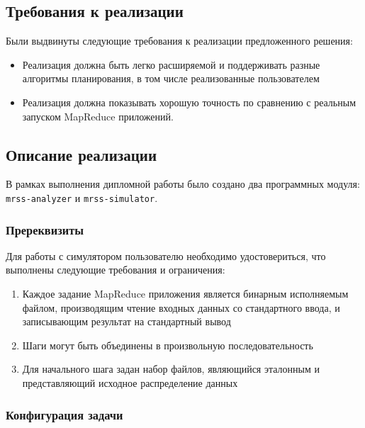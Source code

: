 \documentclass[../diploma.tex]{subfile}
\begin{document}
 
    \subsection{Требования к реализации}
    \label{sec:results:subsec:requirements}

    Были выдвинуты следующие требования к реализации предложенного решения:

    \begin{itemize}
        \item Реализация должна быть легко расширяемой и поддерживать разные
              алгоритмы планирования, в том числе реализованные пользователем
        \item Реализация должна показывать хорошую точность по сравнению с
              реальным запуском MapReduce приложений.
    \end{itemize}

    \subsection{Описание реализации}
    \label{sec:results:subsec:final}

    В рамках выполнения дипломной работы было создано два программных модуля:
    \texttt{mrss-analyzer} и \texttt{mrss-simulator}.

    \subsubsection{Пререквизиты}

    Для работы с симулятором пользователю необходимо удостовериться, что
    выполнены следующие требования и ограничения:

    \begin{enumerate}
        \item Каждое задание MapReduce приложения является бинарным исполняемым
              файлом, производящим чтение входных данных со стандартного ввода,
              и записывающим результат на стандартный вывод
        \item Шаги могут быть объединены в произвольную последовательность
        \item Для начального шага задан набор файлов, являющийся эталонным и
              представляющий исходное распределение данных
    \end{enumerate}

    \subsubsection{Конфигурация задачи}
\end{document}
